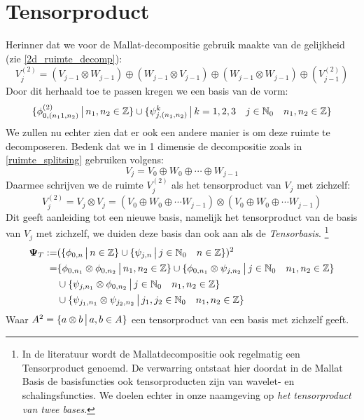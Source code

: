 \section{Tensorproduct}
Herinner dat we voor de Mallat-decompositie gebruik maakte van de gelijkheid (zie \ref{2d_ruimte_decomp}):
\[
V_{j}^{(2)} = (V_{j-1}\otimes W_{j-1}) \oplus (W_{j-1}\otimes V_{j-1}) \oplus
(W_{j-1}\otimes W_{j-1}) \oplus (V^{(2)}_{j-1})
\]
Door dit herhaald toe te passen kregen we een basis van de vorm:
\[
\{\phi^{(2)}_{0,(n_11,n_2)}\,\big|\, n_1,n_2\in\mathbb{Z}\}\cup
\{\psi^k_{j,(n_1,n_2)} \,\big|\, k=1,2,3\quad j\in \mathbb{N}_0 \quad n_1,n_2\in\mathbb{Z}\}
\]
We zullen nu echter zien dat er ook een andere manier is om deze ruimte te decomposeren.
Bedenk dat we in 1 dimensie de decompositie zoals in \ref{ruimte_splitsing} gebruiken volgens:
\[
V_j = V_0 \oplus W_0 \oplus \cdots \oplus W_{j-1}
\]
Daarmee schrijven we de ruimte $V^{(2)}_j$ als het tensorproduct van $V_j$ met zichzelf:
\[
V^{(2)}_j = V_j\otimes V_j = (V_0\oplus W_0\oplus\cdots W_{j-1})\otimes(V_0\oplus W_0\oplus\cdots W_{j-1})
\]
Dit geeft aanleiding tot een nieuwe basis, namelijk het tensorproduct van de basis van $V_j$ met zichzelf,
we duiden deze basis dan ook aan als de \emph{Tensorbasis}.
\footnote{In de literatuur wordt de Mallatdecompositie ook regelmatig een Tensorproduct genoemd. 
De verwarring ontstaat hier doordat in de Mallat Basis de basisfuncties ook tensorproducten zijn van wavelet- 
en schalingsfuncties. We doelen echter in onze naamgeving op \emph{het tensorproduct van twee bases}.}
\begin{equation}
  \label{tensor_basis_def}
  \begin{split}
    \boldsymbol \Psi_T :=& (\{\phi_{0,n}\,\big|\, n\in\mathbb{Z}\}\cup \{\psi_{j,n}\,\big|\, j\in\mathbb{N}_0\quad n\in\mathbb{Z}\})^2\\
                        =& \{\phi_{0,n_1}\otimes\phi_{0,n_2}\,\big|\, n_1,n_2\in\mathbb{Z}\} 
                        \cup \{\phi_{0,n_1}\otimes\psi_{j,n_2}\,\big|\, j\in\mathbb{N}_0\quad n_1,n_2\in\mathbb{Z}\} \\    
                         & \cup \{\psi_{j,n_1}\otimes\phi_{0,n_2}\,\big|\, j\in\mathbb{N}_0\quad n_1,n_2\in\mathbb{Z}\} \\
                         & \cup \{\psi_{j_1,n_1}\otimes\psi_{j_2,n_2}\,\big|\, j_1,j_2\in\mathbb{N}_0\quad n_1,n_2\in\mathbb{Z}\} \\
  \end{split}
\end{equation}
Waar $A^2 = \{a\otimes b \,\big|\, a,b\in A\}$ een tensorproduct van een basis met zichzelf geeft.

